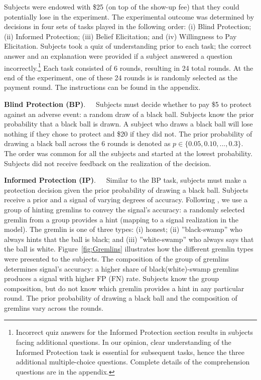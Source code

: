 \documentclass[12pt,a4paper]{article}
\begin{document}
 
Subjects were endowed with \$25 (on top of the show-up fee) that they could potentially lose in the experiment. The experimental outcome was determined by decisions in four sets of tasks played in the following order: (i) Blind Protection; (ii) Informed Protection; (iii) Belief Elicitation; and (iv) Willingness to Pay Elicitation. Subjects took a quiz of understanding prior to each task; the correct answer and an explanation were provided if a subject answered a question incorrectly.\footnote{Incorrect quiz answers for the Informed Protection section results in subjects facing additional questions. In our opinion, clear understanding of the Informed Protection task is essential for subsequent tasks, hence the three additional multiple-choice questions. Complete details of the comprehension questions are in the appendix.} Each task consisted of 6 rounds, resulting in 24 total rounds. At the end of the experiment, one of these 24 rounds is is randomly selected as the payment round. The instructions can be found in the appendix.


\bigskip
\noindent\textbf{Blind Protection (BP)}.\ \ \ Subjects must decide whether to pay \$5 to protect against an adverse event: a random draw of a black ball.  Subjects know the prior probability that a black ball is drawn. A subject who draws a black ball will lose nothing if they chose to protect and \$20 if they did not. The prior probability of drawing a black ball across the 6 rounds is denoted as $p \in \{0.05,0.10,...,0.3\}$. The order was common for all the subjects and started at the lowest probability. Subjects did not receive feedback on the realization of the decision.

\bigskip
\noindent\textbf{Informed Protection (IP)}.\ \ \ Similar to the BP task, subjects must make a protection decision given the prior probability of drawing a black ball. Subjects receive a prior and a signal of varying degrees of accuracy. Following \citet{coutts_good_2019}, we use a group of hinting gremlins to convey the signal's accuracy: a randomly selected gremlin from a group provides a hint (mapping to a signal realization in the model). The gremlin is one of three types: (i) honest; (ii) ''black-swamp'' who always hints that the ball is black; and (iii) ''white-swamp'' who always says that the ball is white. Figure~\ref{fig:Gremlins} illustrates how the different gremlin types were presented to the subjects. The composition of the group of gremlins determines signal's accuracy: a higher share of black(white)-swamp gremlins produces a signal with higher FP (FN) rate. Subjects know the group composition, but do not know which gremlin provides a hint in any particular round. The prior probability of drawing a black ball and the composition of gremlins vary across the rounds.  
\end{document}
